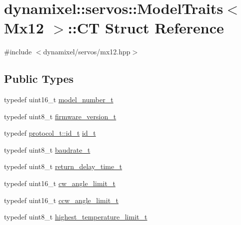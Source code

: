 \hypertarget{structdynamixel_1_1servos_1_1_model_traits_3_01_mx12_01_4_1_1_c_t}{}\section{dynamixel\+:\+:servos\+:\+:Model\+Traits$<$ Mx12 $>$\+:\+:C\+T Struct Reference}
\label{structdynamixel_1_1servos_1_1_model_traits_3_01_mx12_01_4_1_1_c_t}


{\ttfamily \#include $<$dynamixel/servos/mx12.\+hpp$>$}

\subsection*{Public Types}
\begin{DoxyCompactItemize}
\item 
typedef uint16\+\_\+t \hyperlink{structdynamixel_1_1servos_1_1_model_traits_3_01_mx12_01_4_1_1_c_t_aa49ded417f5eb4ce0635e9ae1e7f7e98}{model\+\_\+number\+\_\+t}
\item 
typedef uint8\+\_\+t \hyperlink{structdynamixel_1_1servos_1_1_model_traits_3_01_mx12_01_4_1_1_c_t_aa6e7428ef9843550bcd287a50b297e04}{firmware\+\_\+version\+\_\+t}
\item 
typedef \hyperlink{classdynamixel_1_1protocols_1_1_protocol1_a1d4dfa22b01f80b1876d14f539d52b5c}{protocol\+\_\+t\+::id\+\_\+t} \hyperlink{structdynamixel_1_1servos_1_1_model_traits_3_01_mx12_01_4_1_1_c_t_adaa72c9dcb7adcf260b4603d5754f018}{id\+\_\+t}
\item 
typedef uint8\+\_\+t \hyperlink{structdynamixel_1_1servos_1_1_model_traits_3_01_mx12_01_4_1_1_c_t_a4317682b778a887ec8ca06082d4ffd19}{baudrate\+\_\+t}
\item 
typedef uint8\+\_\+t \hyperlink{structdynamixel_1_1servos_1_1_model_traits_3_01_mx12_01_4_1_1_c_t_a12bd046468fce71ae7ab82b058a5f610}{return\+\_\+delay\+\_\+time\+\_\+t}
\item 
typedef uint16\+\_\+t \hyperlink{structdynamixel_1_1servos_1_1_model_traits_3_01_mx12_01_4_1_1_c_t_ab918f9d168fa3d072953a3a0a8b2351b}{cw\+\_\+angle\+\_\+limit\+\_\+t}
\item 
typedef uint16\+\_\+t \hyperlink{structdynamixel_1_1servos_1_1_model_traits_3_01_mx12_01_4_1_1_c_t_a1162e36769e164a1dda04a830642acb4}{ccw\+\_\+angle\+\_\+limit\+\_\+t}
\item 
typedef uint8\+\_\+t \hyperlink{structdynamixel_1_1servos_1_1_model_traits_3_01_mx12_01_4_1_1_c_t_a1ad58c27476d8ecd28ec9a4127b48802}{highest\+\_\+temperature\+\_\+limit\+\_\+t}

\end{DoxyCompactItemize}
